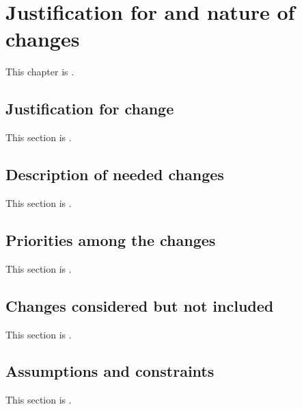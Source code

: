 
\chapter{Justification for and nature of changes}
\label{loc:Justification for and nature of changes}
% 

This chapter is \TBD.


\section{Justification for change}
\label{loc:Justification for change}
% 

This section is \TBD.


\section{Description of needed changes}
\label{loc:Description of needed changes}
% 

This section is \TBD.


\section{Priorities among the changes}
\label{loc:Priorities among the changes}
% 

This section is \TBD.


\section{Changes considered but not included}
\label{loc:Changes considered but not included}
% 

This section is \TBD.


\section{Assumptions and constraints}
\label{loc:Assumptions and constraints}
% 

This section is \TBD.
